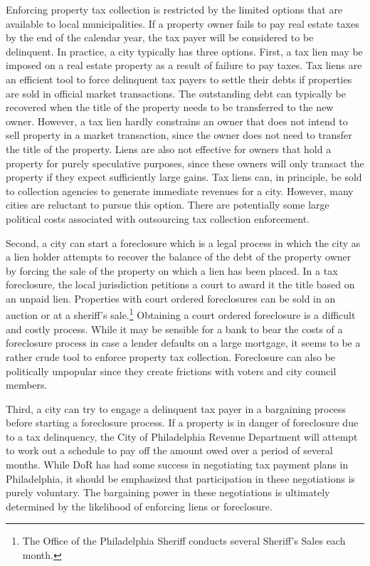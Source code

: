 \documentclass[12pt,titlepage]{article}
\begin{document}
Enforcing property tax collection is restricted by the limited options
that are available to local municipalities. If a property owner fails
to pay real estate taxes by the end of the calendar year, the tax
payer will be considered to be delinquent.  In practice, a city
typically has three options. First, a tax lien may be imposed on a
real estate property as a result of failure to pay taxes. Tax liens
are an efficient tool to force delinquent tax payers to settle their
debts if properties are sold in official market transactions. The outstanding
debt can typically be recovered when the title of the property needs
to be transferred to the new owner. However, a tax lien hardly
constrains an owner that does not intend to sell property in a market
transaction, since the owner does not need to transfer the title of
the property. Liens are also not effective for owners that hold a
property for purely speculative purposes, since these owners will only
transact the property if they expect sufficiently large gains. Tax
liens can, in principle, be sold to collection agencies to generate
immediate revenues for a city. However, many cities are reluctant to
pursue this option. There are potentially some large political costs
associated with outsourcing tax collection enforcement.

Second, a city can start a foreclosure which is a legal process in
which the city as a lien holder attempts to recover the balance of the
debt of the property owner by forcing the sale of the property on
which a lien has been placed.  In a tax foreclosure, the local jurisdiction
petitions a court to award it the title based on an unpaid lien. 
Properties with court ordered foreclosures can be
 sold in an auction or  at a sheriff's sale.\footnote{The Office of
the Philadelphia Sheriff conducts several Sheriff's Sales each month.}
Obtaining a court ordered foreclosure is a difficult and costly process. While
it may be sensible for a bank to bear the costs of a foreclosure process 
in case a lender defaults on a large mortgage, it
seems to be a rather crude tool to enforce property tax collection.
Foreclosure can also be politically unpopular since they create
frictions with voters and city council members.

Third, a city can try to engage a delinquent tax payer in a bargaining
process before starting a foreclosure process. If a property is in
danger of foreclosure due to a tax delinquency, the City of
Philadelphia Revenue Department will attempt to work out a schedule to
pay off the amount owed over a period of several months. While DoR has
had some success in negotiating tax payment plans in Philadelphia, it
should be emphasized that participation in these negotiations is
purely voluntary. The bargaining power in these negotiations is
ultimately determined by the likelihood of enforcing liens or foreclosure.
\end{document}
